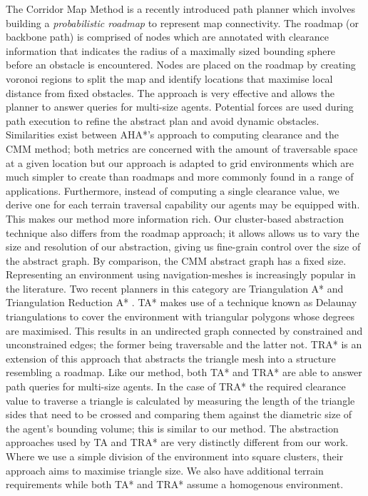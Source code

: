 \medskip
The Corridor Map Method \cite{geraerts07} is a recently introduced path planner which involves building a \emph{probabilistic roadmap} to represent map connectivity. 
The roadmap (or backbone path) is comprised of nodes which are annotated with clearance information that indicates the radius of a maximally sized bounding sphere before an obstacle is encountered. Nodes are placed on the roadmap by creating voronoi regions to split the map and identify locations that maximise local distance from fixed obstacles. The approach is very effective and allows the planner to answer queries for multi-size agents. Potential forces are used during path execution to refine the abstract plan and avoid dynamic obstacles. \newline
Similarities exist between AHA*'s approach to computing clearance and the CMM  method; both metrics are concerned with the amount of traversable space at a given location but our approach is adapted to grid environments which are much simpler to create than roadmaps and more commonly found in a range of applications. 
Furthermore, instead of computing a single clearance value, we derive one for each terrain traversal capability our agents may be equipped with. 
This makes our method more information rich. 
Our cluster-based abstraction technique also differs from the roadmap approach; it allows allows us to vary the size and resolution of our abstraction, giving us fine-grain control over the size of the abstract graph. By comparison, the CMM abstract graph has a fixed size.
\medskip
Representing an environment using navigation-meshes is increasingly popular in the literature. Two recent planners in this category are Triangulation A* and Triangulation Reduction A* \cite{demyen07}. TA* makes use of a technique known as Delaunay triangulations to cover the environment with triangular polygons whose degrees are maximised. This results in an undirected graph connected by constrained and unconstrained edges; the former being traversable and the latter not. TRA* is an extension of this approach that abstracts the triangle mesh into a structure resembling a roadmap. 
Like our method, both TA* and TRA* are able to answer path queries for multi-size agents. 
In the case of TRA* the required clearance value to traverse a triangle is calculated by measuring the length of the triangle sides that need to be crossed and comparing them against the diametric size of the agent's bounding volume; this is similar to our method. The abstraction approaches used by TA and TRA* are very distinctly different from our work. Where we use a simple division of the environment into square clusters, their approach aims to maximise triangle size. We also have additional terrain requirements while both TA* and TRA* assume a homogenous environment.

